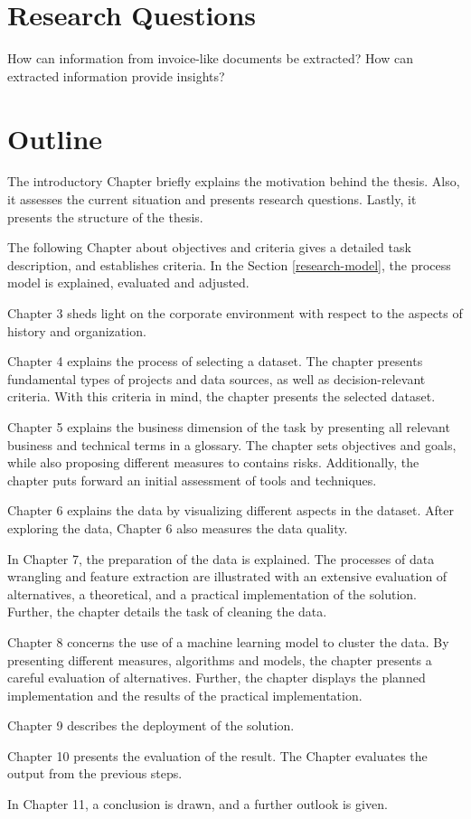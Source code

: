 \section{Research Questions}
\label{section:research-q}
How can information from invoice-like documents be extracted?
How can extracted information provide insights?

\section{Outline}
The introductory Chapter briefly explains the motivation behind the thesis. Also, it assesses the current situation and presents research questions. Lastly, it presents the structure of the thesis.

The following Chapter about objectives and criteria gives a detailed task description, and establishes criteria. In the Section \ref{research-model}, the process model is explained, evaluated and adjusted.

Chapter 3 sheds light on the corporate environment with respect to the aspects of history and organization.

Chapter 4 explains the process of selecting a dataset. The chapter presents fundamental types of projects and data sources, as well as decision-relevant criteria. With this criteria in mind, the chapter presents the selected dataset.

Chapter 5 explains the business dimension of the task by presenting all relevant business and technical terms in a glossary. The chapter sets objectives and goals, while also proposing different measures to contains risks.
Additionally, the chapter puts forward an initial assessment of tools and techniques.

Chapter 6 explains the data by visualizing different aspects in the dataset. After exploring the data, Chapter 6 also measures the data quality.

In Chapter 7, the preparation of the data is explained. The processes of data wrangling and feature extraction are illustrated with an extensive evaluation of alternatives, a theoretical, and a practical implementation of the solution. Further, the chapter details the task of cleaning the data.

Chapter 8 concerns the use of a machine learning model to cluster the data. By presenting different measures, algorithms and models, the chapter presents a careful evaluation of alternatives. Further, the chapter displays the planned implementation and the results of the practical implementation.

Chapter 9 describes the deployment of the solution.

Chapter 10 presents the evaluation of the result. The Chapter evaluates the output from the previous steps.

In Chapter 11, a conclusion is drawn, and a further outlook is given.